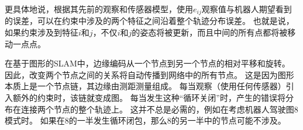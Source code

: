 更具体地说，根据其先前的观察和传感器模型，使用$ e_ {ij} $观察值与机器人期望看到的误差，可以在约束中涉及的两个特征之间沿着整个轨迹分布误差。 也就是说，如果约束涉及到特征$ i $和$ j $，不仅$ i $和$ j $的姿态将被更新，而且中间的所有点都将被移动一点点。





在基于图形的SLAM中，边缘编码从一个节点到另一个节点的相对平移和旋转。 因此，改变两个节点之间的关系将自动传播到网络中的所有节点。 这是因为图形本质上是一个节点链，其边缘由测距测量组成。 每当观察（使用任何传感器）引入额外的约束时，该链就变成图。 每当发生这种“循环关闭”时，产生的错误将分布在连接两个节点的整个轨迹上。 这并不总是必需的，例如在考虑机器人驾驶图8模式时。 如果在8的一半发生循环闭包，那么8的另一半中的节点可能不涉及。



